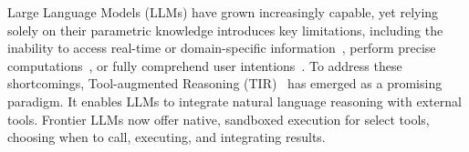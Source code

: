 \documentclass[11pt]{article}
\newcommand{\farima}[1]{{\color{orange}Farima: #1}}
\newcommand{\pouya}[1]{{\color{violet}Pouya: #1}}
\begin{document}
Large Language Models (LLMs) have grown increasingly capable, yet relying solely on their parametric knowledge introduces key limitations, including the inability to access real-time or domain-specific information~\citep{yu-ji-2024-information, wang2025actingreasoningmoreteaching}, perform precise computations~\citep{lu-etal-2023-survey}, or fully comprehend user intentions~\citep{qian-etal-2024-tell}. 
To address these shortcomings, Tool-augmented Reasoning (TIR)~\citep{toolformer, gou2024tora} has emerged as a promising paradigm. It enables LLMs to integrate natural language reasoning with external tools. 
Frontier LLMs \citep{gptmodels, geminimodels, claudemodels} now offer native, sandboxed execution for select tools, choosing when to call, executing, and integrating results. 

\end{document}

